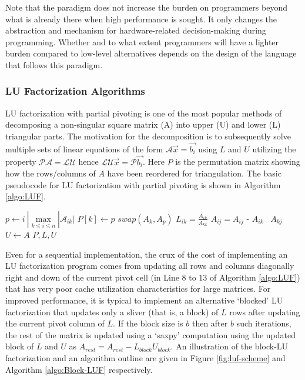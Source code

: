 \documentclass[ASNA,twocolumn]{USG} %
\begin{document}
{{Note that the paradigm does not increase the burden on programmers beyond what is already there when high performance is sought. It only changes the abstraction and mechanism for hardware-related decision-making during programming. Whether and to what extent programmers will have a lighter burden compared to low-level alternatives depends on the design of the language that follows this paradigm. 
}

\subsubsection*{LU Factorization Algorithms}
LU factorization with partial pivoting is one of the most popular methods of decomposing a non-singular square matrix (A) into upper (U) and lower (L) triangular parts. The motivation for the decomposition is to subsequently solve multiple sets of linear equations of the form $\mathcal{A} \vec{x} = \vec{b_i}$ using $L$ and $U$ utilizing the property $\mathcal{PA} = \mathcal{LU}$ hence $\mathcal{LU}\vec{x}=\mathcal{P}\vec{b_i}$. Here $P$ is the permutation matrix showing how the rows/columns of $A$ have been reordered for triangulation. The basic pseudocode for LU factorization with partial pivoting is shown in Algorithm \ref{algo:LUF}.

\begin{algorithm}
	\caption{Basic LU Factorization algorithm}\label{algo:LUF}
	\begin{algorithmic}[1]
		 
		\State $p \gets i\ | \max\limits_{k \leq i \leq n}|\mathcal{A}_{ik}|$
		\State $P[k] \gets p$
		\State $swap(A_k, A_p)$
		 
		\State $L_{ik} = \frac{A_{ik}}{A_{kk}}$
		\EndFor
		\State  {}
		\State $A_{ij} = A_{ij}$ - $A_{ik}$ \texttimes \  $A_{kj}$
		\EndFor
		\EndFor
		\EndFor
		\State $U \gets A$
		\State \Return $P,L,U$
	\end{algorithmic}
\end{algorithm}

Even for a sequential implementation, the crux of the cost of implementing an LU factorization program comes from updating all rows and columns diagonally right and down of the current pivot cell (in Line $8$ to $13$ of Algorithm \ref{algo:LUF}) that has very poor cache utilization characteristics for large matrices. For improved performance, it is typical to implement an alternative `blocked' LU factorization that updates only a sliver (that is, a block) of $L$ rows after updating the current pivot column of $L$. If the block size is $b$ then after $b$ such iterations, the rest of the matrix is updated using a `saxpy' computation using the updated block of $L$ and $U$ as $A_{rest} = A_{rest} - L_{block}U_{block}$. An illustration of the block-LU factorization and an algorithm outline are given in Figure \ref{fig:luf-scheme} and Algorithm \ref{algo:Block-LUF} respectively.

}
\end{document}

